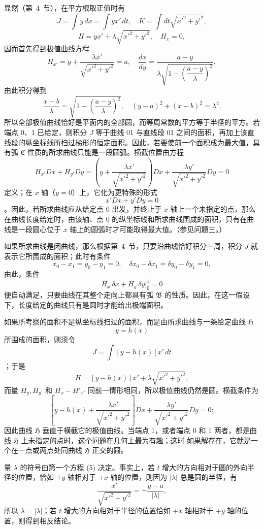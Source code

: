 \documentclass[11pt,a4paper,leqno]{article}
\begin{document}
显然（第~4~节），在平方根取正值时有
\[
J=\int y\,dx=\int yx'\,dt,
\quad
K=\int dt\sqrt{x'^2+y'^2},
\]
\[
H=yx'+\lambda\sqrt{x'^2+y'^2},
\quad
H_x=0,
\]
因而首先得到极值曲线方程
\begin{equation}\tag{5}
H_{x'}=y+\frac{\lambda x'}{\sqrt{x'^2+y'^2}}=a,
\quad
\frac{dx}{dy}=\frac{a-y}{\lambda\sqrt{1-\left(\dfrac{a-y}{\lambda}\right)^2}},
\end{equation}
由此积分得到
\[
\frac{x-b}{\lambda}=\sqrt{1-\left(\frac{a-y}{\lambda}\right)^2},
\quad
(y-a)^2+(x-b)^2=\lambda^2.
\]
所以全部极值曲线恰好是平面内的全部圆，而等周常数的平方等于半径的平方。若端点 0、1 已给定，则积分 $J$ 等于曲线 01 与直线段 01 之间的面积，再加上该直线段的纵坐标线所扫过梯形的恒定面积。因此，若要使前一个面积成为最大值，具有弧 $\mathfrak{C}$ 性质的所求曲线只能是一段圆弧。横截位置由方程
\[
H_{x'}Dx+H_{y'}Dy=
\left(y+\frac{\lambda x'}{\sqrt{x'^2+y'^2}}\right)Dx+
\frac{\lambda y'}{\sqrt{x'^2+y'^2}}Dy=0
\]
定义；在 $x$ 轴（$y=0$）上，它化为更特殊的形式
\[
x'Dx+y'Dy=0
\]
。因此，若所求曲线应从给定点 0 出发，并终止于 $x$ 轴上一个未指定的点，那么在曲线长度给定时，由该轴、点 0 的纵坐标线和所求曲线围成的面积，只有在曲线是一段圆心位于 $x$ 轴上的圆弧时才可能取得最大值。（参见问题三。）

如果所求曲线是闭曲线，那么根据第~4~节，只要沿曲线恰好积分一周，积分 $J$ 就表示它所围成的面积；此时有条件
\[
x_0-x_1=y_0-y_1=0,
\quad
\delta x_0-\delta x_1=\delta y_0-\delta y_1=0,
\]
由此，条件
\[
H_{x'}\delta x+H_{y'}\delta y\bigg|_0^1=0
\]
便自动满足，只要曲线在其整个走向上都具有弧 $\mathfrak{B}$ 的性质。因此，在这一假设下，长度给定的曲线只有是圆时才能给出极端面积。

如果所考察的面积不是纵坐标线扫过的面积，而是由所求曲线与一条给定曲线 $\mathfrak{H}$
\[
y=h(x)
\]
所围成的面积，则须令
\[
J=\int [y-h(x)]x'\,dt
\]
；于是
\[
H=[y-h(x)]x'+\lambda\sqrt{x'^2+y'^2},
\]
而量 $H_y,H_{y'}$ 和 $H_x-H'_{x'}$ 同前一情形相同，所以极值曲线仍然是圆。横截条件为
\[
\left[y-h(x)+\frac{\lambda x'}{\sqrt{x'^2+y'^2}}\right]Dx+
\frac{\lambda y'}{\sqrt{x'^2+y'^2}}Dy=0;
\]
因此曲线 $\mathfrak{H}$ 垂直于横截它的极值曲线。当端点 1，或者端点 0 和 1 两者，都是曲线 $\mathfrak{H}$ 上未指定的点时，这个问题在几何上最为有趣；这时
如果解存在，它就是一个在一点或两点处同曲线 $\mathfrak{H}$ 正交的圆。

量 $\lambda$ 的符号由第一个方程 (5) 决定。事实上，若 $t$ 增大的方向相对于圆的外向半径的位置，恰如 $+y$ 轴相对于 $+x$ 轴的位置，则因为 $|\lambda|$ 总是圆的半径，有
\[
\frac{x'}{\sqrt{x'^2+y'^2}}=-\frac{y-a}{|\lambda|},
\]
所以 $\lambda=|\lambda|$；若 $t$ 增大的方向相对于半径的位置恰如 $+x$ 轴相对于 $+y$ 轴的位置，则得到相反结论。
\end{document}
